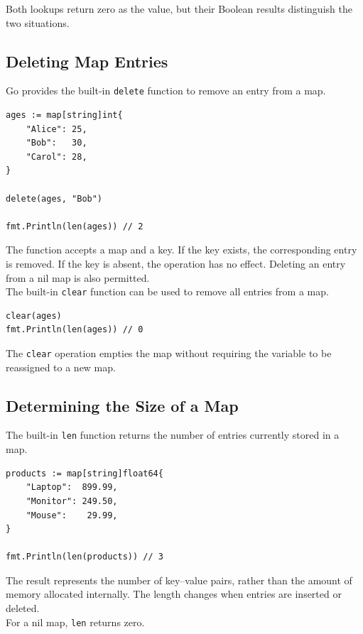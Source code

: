 Both lookups return zero as the value, but their Boolean
results distinguish the two situations.

\subsection{Deleting Map Entries}

Go provides the built-in \texttt{delete} function to
remove an entry from a map.

\begin{lstlisting}
ages := map[string]int{
    "Alice": 25,
    "Bob":   30,
    "Carol": 28,
}

delete(ages, "Bob")

fmt.Println(len(ages)) // 2
\end{lstlisting}

The function accepts a map and a key. If the key exists,
the corresponding entry is removed. If the key is absent,
the operation has no effect. Deleting an entry from a
nil map is also permitted.\\

The built-in \texttt{clear} function can be used to remove
all entries from a map.

\begin{lstlisting}
clear(ages)
fmt.Println(len(ages)) // 0
\end{lstlisting}

The \texttt{clear} operation empties the map without
requiring the variable to be reassigned to a new map.

\subsection{Determining the Size of a Map}

The built-in \texttt{len} function returns the number of
entries currently stored in a map.

\begin{lstlisting}
products := map[string]float64{
    "Laptop":  899.99,
    "Monitor": 249.50,
    "Mouse":    29.99,
}

fmt.Println(len(products)) // 3
\end{lstlisting}

The result represents the number of key--value pairs,
rather than the amount of memory allocated internally.
The length changes when entries are inserted or deleted.\\

For a nil map, \texttt{len} returns zero.

